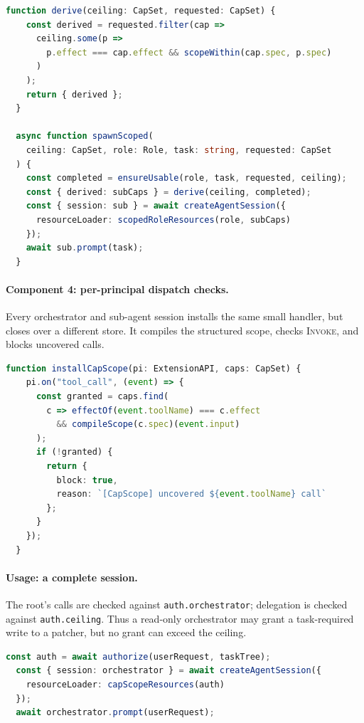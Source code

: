 \documentclass[sigplan,review,anonymous]{acmart}
\newcommand{\tool}{CapScope\xspace}
\newcommand{\rulename}[1]{\textsc{#1}}
\begin{document}
  \begin{lstlisting}[language=TypeScript,style=tsstyle,caption={Schematic
    pseudocode for deriving and transferring a sub-agent store.}]
  function derive(ceiling: CapSet, requested: CapSet) {
    const derived = requested.filter(cap =>
      ceiling.some(p =>
        p.effect === cap.effect && scopeWithin(cap.spec, p.spec)
      )
    );
    return { derived };
  }

  async function spawnScoped(
    ceiling: CapSet, role: Role, task: string, requested: CapSet
  ) {
    const completed = ensureUsable(role, task, requested, ceiling);
    const { derived: subCaps } = derive(ceiling, completed);
    const { session: sub } = await createAgentSession({
      resourceLoader: scopedRoleResources(role, subCaps)
    });
    await sub.prompt(task);
  }
  \end{lstlisting}

  \paragraph{Component 4: per-principal dispatch checks.}
  Every orchestrator and sub-agent session installs the same small handler, but
  closes over a different store. It compiles the structured scope, checks
  \rulename{Invoke}, and blocks uncovered calls.

  \begin{lstlisting}[language=TypeScript,style=tsstyle,caption={Schematic
    pseudocode for the per-principal \tool\ hook.}]
  function installCapScope(pi: ExtensionAPI, caps: CapSet) {
    pi.on("tool_call", (event) => {
      const granted = caps.find(
        c => effectOf(event.toolName) === c.effect
          && compileScope(c.spec)(event.input)
      );
      if (!granted) {
        return {
          block: true,
          reason: `[CapScope] uncovered ${event.toolName} call`
        };
      }
    });
  }
  \end{lstlisting}

  \paragraph{Usage: a complete session.}
  The root's calls are checked against \texttt{auth.orchestrator}; delegation
  is checked against \texttt{auth.ceiling}. Thus a read-only orchestrator may
  grant a task-required write to a patcher, but no grant can exceed the ceiling.

  \begin{lstlisting}[language=TypeScript,style=tsstyle,caption={Schematic
    pseudocode for orchestrator setup.}]
  const auth = await authorize(userRequest, taskTree);
  const { session: orchestrator } = await createAgentSession({
    resourceLoader: capScopeResources(auth)
  });
  await orchestrator.prompt(userRequest);
  \end{lstlisting}
\end{document}
